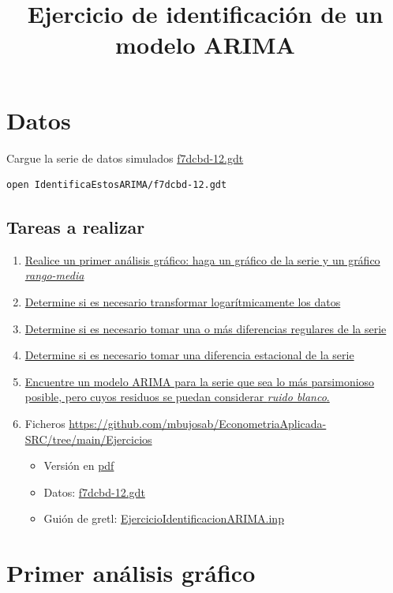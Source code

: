 \documentclass[10pt]{article}
\date{}
\title{Ejercicio de identificación de un modelo ARIMA}
\begin{document}
\maketitle
\section*{Datos}
\label{sec:orgf6707f1}

Cargue la serie de datos simulados \href{IdentificaEstosARIMA/f7dcbd-12.gdt}{f7dcbd-12.gdt}

\begin{verbatim}
open IdentificaEstosARIMA/f7dcbd-12.gdt
\end{verbatim}
\subsection*{Tareas a realizar}
\label{sec:org716b738}

\begin{enumerate}
\item \hyperref[sec:orgcdb3705]{Realice un primer análisis gráfico: haga
un gráfico de la serie y un gráfico \emph{rango-media}}
\item \hyperref[sec:org3502080]{Determine si es necesario transformar logarítmicamente los datos}
\item \hyperref[sec:org8d2b32f]{Determine si es necesario tomar una o
más diferencias regulares de la serie}
\item \hyperref[sec:org55f9a3a]{Determine si es necesario tomar una
diferencia estacional de la serie}
\item \hyperref[sec:org43f2d8d]{Encuentre un modelo ARIMA para la
serie que sea lo más parsimonioso posible, pero cuyos residuos se
puedan considerar \emph{ruido blanco}.}

\item Ficheros \url{https://github.com/mbujosab/EconometriaAplicada-SRC/tree/main/Ejercicios}
\begin{itemize}
\item Versión en \href{EjercicioIdentificacionARIMA.pdf}{pdf}
\item Datos: \href{IdentificaEstosARIMA/f7dcbd-12.gdt}{f7dcbd-12.gdt}
\item Guión de gretl: \url{EjercicioIdentificacionARIMA.inp}
\end{itemize}
\end{enumerate}
\section*{Primer análisis gráfico}
\label{sec:orgcdb3705}
\end{document}
